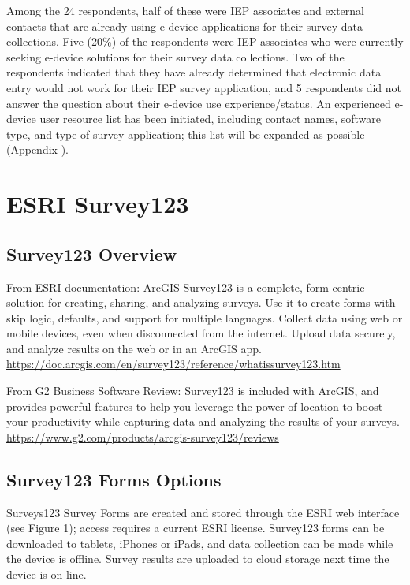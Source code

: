 \documentclass[
]{book}
\theoremstyle{definition}
\theoremstyle{definition}
\theoremstyle{definition}
\theoremstyle{definition}
\theoremstyle{remark}
\begin{document}
Among the 24 respondents, half of these were IEP associates and external contacts that are already using e-device applications for their survey data collections. Five (20\%) of the respondents were IEP associates who were currently seeking e-device solutions for their survey data collections. Two of the respondents indicated that they have already determined that electronic data entry would not work for their IEP survey application, and 5 respondents did not answer the question about their e-device use experience/status. An experienced e-device user resource list has been initiated, including contact names, software type, and type of survey application; this list will be expanded as possible (Appendix ).

\hypertarget{esri-survey123}{%
\chapter{ESRI Survey123}\label{esri-survey123}}

\hypertarget{survey123-overview}{%
\section{Survey123 Overview}\label{survey123-overview}}

From ESRI documentation: ArcGIS Survey123 is a complete, form-centric solution for creating, sharing, and analyzing surveys. Use it to create forms with skip logic, defaults, and support for multiple languages. Collect data using web or mobile devices, even when disconnected from the internet. Upload data securely, and analyze results on the web or in an ArcGIS app.
\url{https://doc.arcgis.com/en/survey123/reference/whatissurvey123.htm}

From G2 Business Software Review: Survey123 is included with ArcGIS, and provides powerful features to help you leverage the power of location to boost your productivity while capturing data and analyzing the results of your surveys. \url{https://www.g2.com/products/arcgis-survey123/reviews}

\hypertarget{survey123-forms-options}{%
\section{Survey123 Forms Options}\label{survey123-forms-options}}

Surveys123 Survey Forms are created and stored through the ESRI web interface (see Figure 1); access requires a current ESRI license. Survey123 forms can be downloaded to tablets, iPhones or iPads, and data collection can be made while the device is offline. Survey results are uploaded to cloud storage next time the device is on-line.
\end{document}
